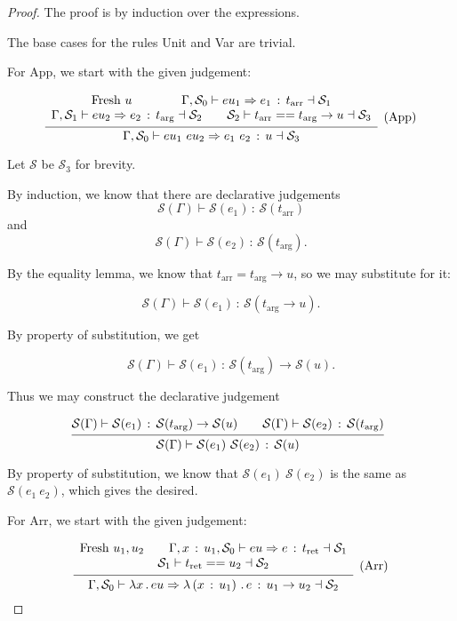 \documentclass{article}
\newcommand{\G}{\Gamma}
\newcommand{\St}{\mathcal{S}}
\newcommand{\tarr}{t_{\text{arr}}}
\newcommand{\targ}{t_{\text{arg}}}
\newcommand{\tret}{t_{\text{ret}}}
\newcommand{\uv}{u}
\newcommand{\eu}{eu}
\newcommand{\e}{e}
\newcommand{\x}{x}
\newcommand{\spc}{\qquad}
\newcommand{\eq}{==}
\renewcommand{\implies}{\Rightarrow}
\newcommand{\fresh}{\text{Fresh}\ }
\newcommand{\withtp}[2]{{#1} \,:\, {#2}}
\newcommand{\app}[2]{{#1}\ {#2}}
\newcommand{\lam}[2]{\lambda {#1} \,.\, {#2}}
\newcommand{\lamtp}[3]{\lambda \left( {\withtp {#1} {#2}} \right) \,.\, {#3}}
\newcommand{\arr}[2]{{#1} \to {#2}}
\newcommand{\hastp}[3]{#1 \vdash {\withtp {#2} {#3}}}
\newcommand{\algtp}[6]{#1, #2 \vdash #3 \implies {\withtp {#4} {#5}} \dashv #6}
\newcommand{\equals}[4]{{#1} \vdash {#2} \eq {#3} \dashv {#4}}
\newcommand{\deduct}[3][]
{
  \begin{prooftree}
    \hypo{#2}
    \infer1[\text{#1}]{#3}
  \end{prooftree}
}
\begin{document}
\begin{proof}
  The proof is by induction over the expressions.

  The base cases for the rules Unit and Var are trivial.

  For App, we start with the given judgement:

\[
  \deduct
  {\begin{array}{c}
    \fresh \uv \spc \spc
   \algtp \G {\St_0} {\eu_1} {\e_1} \tarr {\St_1} \\
   \algtp \G {\St_1} {\eu_2} {\e_2} \targ {\St_2} \spc
   \equals {\St_2} {\tarr} {\arr {\targ} \uv} {\St_3}
   \end{array}
  }
  {\algtp \G {\St_0} {\app {\eu_1} {\eu_2}} {\app {\e_1} {\e_2}} {\uv} {\St_3}}
  {\text{(App)}}
\]

  Let \(\St\) be \(\St_3\) for brevity.
  
  By induction, we know that there are declarative judgements
  \[ \hastp {\St(\G)} {\St(\e_1)} {\St(\tarr)} \]
  and
  \[ \hastp {\St(\G)} {\St(\e_2)} {\St(\targ)}.\]

  By the equality lemma, we know that \(\tarr = \arr \targ \uv\), so we may
  substitute for it:

  \[ \hastp {\St(\G)} {\St(\e_1)} {\St(\arr \targ \uv)}.\]

  By property of substitution, we get

  \[ \hastp {\St(\G)} {\St(\e_1)} {\arr {\St(\targ)} {\St(\uv)}}.\]

  Thus we may construct the declarative judgement
  
  \[
    \deduct
    {\hastp {\St(\G)} {\St(\e_1)} {\arr {\St(\targ)} {\St(\uv)}} \spc
     \hastp {\St(\G)} {\St(\e_2)} {\St(\targ)}
    }
    {\hastp {\St(\G)} {\app {\St(\e_1)} {\St(\e_2)}} {\St(\uv)}}
    {}
  \]

  By property of substitution, we know that \(\app {\St(\e_1)} {\St(\e_2)}\) is
  the same as \(\St(\app {\e_1} {\e_2})\), which gives the desired.

  For Arr, we start with the given judgement:

\[
  \deduct
  {
    \begin{array}{c}
      \fresh \uv_1, \uv_2 \spc
      \algtp {\G, \withtp \x {\uv_1}} {\St_0} \eu \e \tret {\St_1} \\
      \equals {\St_1} \tret {\uv_2} {\St_2}
    \end{array}
  }
  {\algtp \G {\St_0} {\lam \x \eu} {\lamtp \x {\uv_1} \e} {\arr {\uv_1} {\uv_2}} {\St_2}}
  {\text{(Arr)}}
\]


\end{proof}
\end{document}
